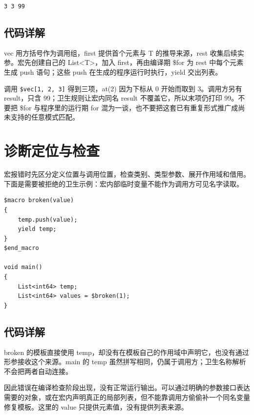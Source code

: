 \par
\medskip
\begin{lstlisting}[style=out]
3 3 99
\end{lstlisting}
\par
\medskip

\subsection*{代码详解}

vec 用方括号作为调用组，first 提供首个元素与 T 的推导来源，rest 收集后续实参。宏先创建自己的 List<T>，加入 first，再由编译期 \$for 为 rest 中每个元素生成 push 语句；这些 push 在生成的程序运行时执行，yield 交出列表。

调用 \texttt{\$vec[\allowbreak{}1,\allowbreak{} 2,\allowbreak{} 3]\allowbreak{}} 得到三项，at(2) 因为下标从 0 开始而取到 3。调用方另有 result，只含 99；卫生规则让宏内同名 result 不覆盖它，所以末项仍打印 99。不要把 \$for 与程序里的运行期 for 混为一谈，也不要把这套已有重复形式推广成尚未支持的任意模式匹配。

\section{诊断定位与检查}

宏报错时先区分定义位置与调用位置，检查类别、类型参数、展开作用域和借用。下面是需要被拒绝的卫生示例：宏内部临时变量不能作为调用方可见名字读取。

\par
\medskip
\begin{lstlisting}[style=chali]
$macro broken(value)
{
    temp.push(value);
    yield temp;
}
$end_macro

void main()
{
    List<int64> temp;
    List<int64> values = $broken(1);
}
\end{lstlisting}
\par
\medskip

\subsection*{代码详解}

broken 的模板直接使用 temp，却没有在模板自己的作用域中声明它，也没有通过形参接收这个来源。main 的 temp 虽然拼写相同，仍属于调用方；卫生名称解析不会把两者自动连接。

因此错误在编译检查阶段出现，没有正常运行输出。可以通过明确的参数接口表达需要的对象，或在宏内声明真正的局部列表，但不能靠调用方偷偷补一个同名变量修复模板。这里的 value 只提供元素值，没有提供列表来源。

